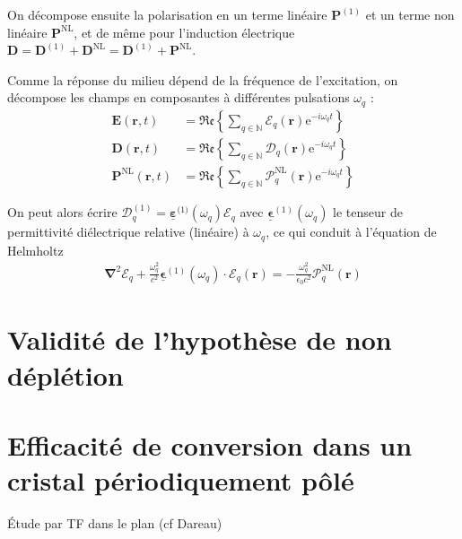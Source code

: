 \documentclass[11pt,a4paper] { article}
\newcommand{\E}{\mathcal{E}}
\newcommand{\e}[1]{\text{e}^{#1}}
\newcommand{\mathsc}[1]{\mathrm{\scriptscriptstyle {#1}}}
\renewcommand{\v}[1]{\boldsymbol{\mathbf{#1}}}
\newcommand{\tens}[1]{\boldsymbol{\underline{#1}}}
\begin{document}
On décompose ensuite la polarisation en un terme linéaire $\v P^\mathsc{(1)}$ et un terme non linéaire $\v P^\mathsc{NL}$, et de même pour l'induction électrique $\v D = \v D^\mathsc{(1)} + \v D^\mathsc{NL} = \v D^\mathsc{(1)} + \v P^\mathsc{NL}$. 

Comme la réponse du milieu dépend de la fréquence de l'excitation, on décompose les champs en composantes à différentes pulsations $\omega_q$ :
\begin{align*}
	\v E(\v r, t) &= \mathfrak{Re} \left\{ \sum_{q \in \mathbb N} \v {\boldsymbol{\mathcal E}}_q (\v r) \e{-i \omega_q t} \right\} \\
	\v D(\v r, t) &= \mathfrak{Re} \left\{ \sum_{q \in \mathbb N} \v {\boldsymbol{\mathcal D}}_q (\v r) \e{-i \omega_q t} \right\} \\
	\v P^\mathsc{NL}(\v r, t) &= \mathfrak{Re} \left\{ \sum_{q \in \mathbb N} \v {\boldsymbol{\mathcal P}}^\mathsc{NL}_q (\v r) \e{-i \omega_q t} \right\}
\end{align*}

On peut alors écrire $\v {\boldsymbol{\mathcal D}}^\mathsc{(1)}_q = \tens \varepsilon^{\mathsc(1)}(\omega_q) \v {\boldsymbol{\mathcal E}}_q$ avec $\tens \epsilon^{(1)}(\omega_q)$ le tenseur de permittivité diélectrique relative (linéaire) à $\omega_q$, ce qui conduit à l'équation de Helmholtz  \citep{boyd}
\begin{align*}
	\boldsymbol{\nabla}^2 \boldsymbol{\E}_q + \frac{\omega_q^2}{c^2}\tens\epsilon^{(1)}(\omega_q)\cdot \v \E_q(\v r) = - \frac{\omega_q^2}{\epsilon_0 c^2} \boldsymbol{\mathcal{P}}^\mathsc{NL}_q(\v r)
\end{align*}

\section{Validité de l'hypothèse de non déplétion}
\label{ndepl}

\section{Efficacité de conversion dans un  cristal périodiquement pôlé}
Étude par TF dans le plan (cf Dareau)
\label{BK}
\end{document}
